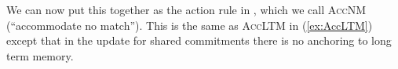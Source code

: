 \begin{ex}
\begin{subex}
\item {}
 
\end{subex} 
   
\end{ex} 
We can now put this together as the action rule in \nexteg{},
which we call \textsc{AccNM} (``accommodate no match'').  This is the same as \textsc{AccLTM} in (\ref{ex:AccLTM}) except that
in the update for shared commitments 
there is no anchoring to long term memory.

